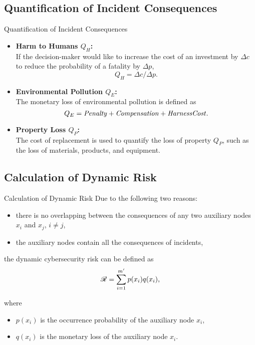 \subsection{Quantification of Incident Consequences}
\begin{frame}{Quantification of Incident Consequences}
    \begin{itemize}
      \item \textbf{Harm to Humans $Q_H$:}\\
      If the decision-maker would like to increase the cost of an investment by $\Delta c$ to reduce the  probability of a fatality by $\Delta p$,
      \[
        Q_H = \Delta c/\Delta p\text{.}
      \]
      \item \textbf{Environmental Pollution $Q_E$:}\\
      The monetary loss of environmental pollution is defined as
      \[
        Q_E = {\it Penalty} + {\it Compensation} + {\it HarnessCost}\text{.}
      \]
      \item \textbf{Property Loss $Q_P$:}\\
      The cost of replacement is used to quantify the loss of property $Q_P$, such as the loss of  materials, products, and equipment.
    \end{itemize}
\end{frame}

\subsection{Calculation of Dynamic Risk}
\begin{frame}{Calculation of Dynamic Risk}
    Due to the following two reasons:
    \begin{itemize}
      \item there is no overlapping between the consequences of any two auxiliary nodes $x_i$ and $x_j$, $i\neq j$,
      \item the auxiliary nodes contain all the consequences of incidents,
    \end{itemize}
    
    the dynamic cybersecurity risk can be defined as 
    \[
        \mathscr{R} = \sum_{i=1}^{m'}p(x_i)q(x_i)\text{,}
    \]
    
    where
    \begin{itemize}
      \item $p(x_i)$ is the occurrence probability of the auxiliary node $x_i$,
      \item $q(x_i)$ is the monetary loss of the auxiliary node $x_i$.
    \end{itemize}
     
\end{frame} 